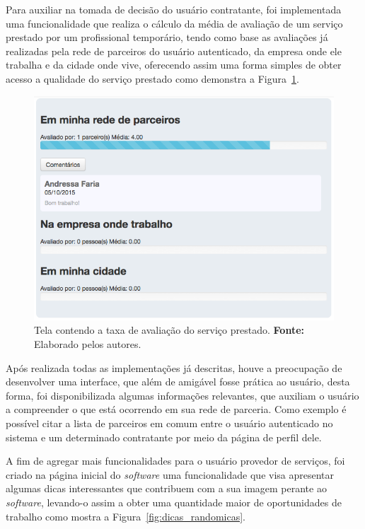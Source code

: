 \par Para auxiliar na tomada de decisão do usuário contratante, foi implementada uma funcionalidade que realiza o cálculo da média de avaliação de um serviço prestado por um profissional temporário, tendo como base as avaliações já realizadas pela rede de parceiros do usuário autenticado, da empresa onde ele trabalha e da cidade onde vive, oferecendo assim uma forma simples de obter acesso a qualidade do serviço prestado como demonstra a Figura~\ref{fig:taxa_avaliacao}.

\newpage
\begin{figure}[h!]
	\centerline{\includegraphics[scale=0.45]{./imagens/taxa-avaliacao.png}}
	\caption[Tela contendo a taxa de avaliação do serviço prestado.]
	{Tela contendo a taxa de avaliação do serviço prestado. \textbf{Fonte:} Elaborado pelos autores.}
	\label{fig:taxa_avaliacao}
\end{figure}

\par Após realizada todas as implementações já descritas, houve a preocupação de desenvolver uma interface, que além de amigável fosse prática ao usuário, desta forma, foi disponibilizada algumas informações relevantes, que auxiliam o usuário a compreender o que está ocorrendo em sua rede de parceria. Como exemplo é possível citar a lista de parceiros em comum entre o usuário autenticado no sistema e um determinado contratante por meio da página de perfil dele.

\par A fim de agregar mais funcionalidades para o usuário provedor de serviços, foi criado na página inicial do \textit{software} uma funcionalidade que visa apresentar algumas dicas interessantes que contribuem com a sua imagem perante ao \textit{software}, levando-o assim a obter uma quantidade maior de oportunidades de trabalho como mostra a Figura~\ref{fig:dicas_randomicas}.

